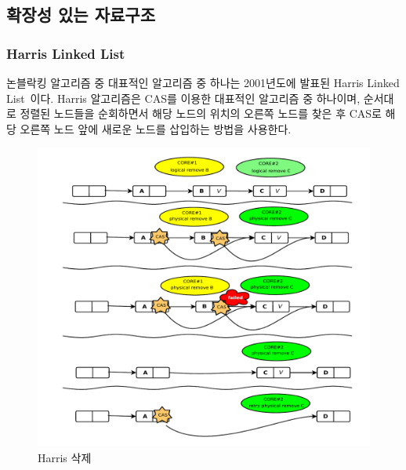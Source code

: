 \subsection{확장성 있는 자료구조}

\subsubsection{Harris Linked List}

논블락킹 알고리즘 중 대표적인 알고리즘 중 하나는 2001년도에 발표된 Harris Linked
List~\cite{Harris2001Lockfree}이다.
Harris 알고리즘은 CAS를 이용한 대표적인 알고리즘 중 하나이며, 순서대로 정렬된 노드들을 순회하면서 해당 
노드의 위치의 오른쪽 노드를 찾은 후 CAS로 해당 오른쪽 노드 앞에 새로운 노드를 삽입하는 방법을 사용한다. 

\begin{figure}[h!]
    \centering
    \includegraphics[width=1\textwidth]{fig/harris/harris}
    \caption{Harris 삭제}
  \label{fig:harris}
\end{figure}


